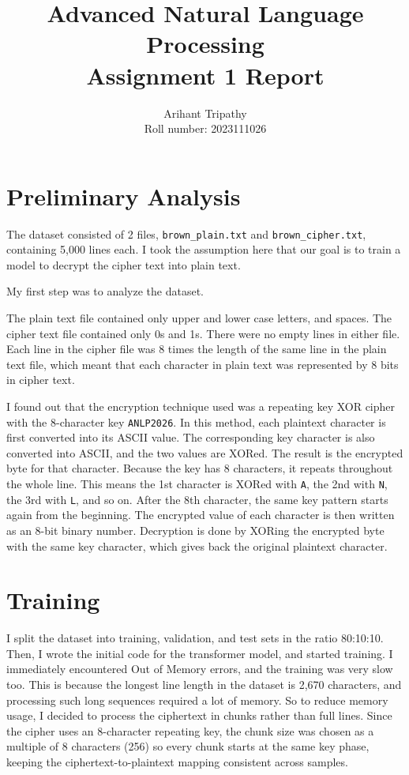 \documentclass[12pt]{article}
\title{\vspace{-1.2cm}Advanced Natural Language Processing\\Assignment 1 Report}
\author{Arihant Tripathy\\\normalsize Roll number: 2023111026}
\date{}
\begin{document}
\maketitle
\vspace{-1cm}

\section{Preliminary Analysis}

The dataset consisted of 2 files, \texttt{brown\_plain.txt} and
\texttt{brown\_cipher.txt}, containing 5,000 lines each. I took the assumption
here that our goal is to train a model to decrypt the cipher text into plain
text.

My first step was to analyze the dataset.

The plain text file contained only upper and lower case letters, and spaces. The
cipher text file contained only 0s and 1s. There were no empty lines in either
file. Each line in the cipher file was 8 times the length of the same line in
the plain text file, which meant that each character in plain text was
represented by 8 bits in cipher text.

I found out that the encryption technique used was a repeating key XOR cipher
with the 8-character key \texttt{ANLP2026}. In this method, each plaintext
character is first converted into its ASCII value. The corresponding key
character is also converted into ASCII, and the two values are XORed. The result
is the encrypted byte for that character. Because the key has 8 characters, it
repeats throughout the whole line. This means the 1st character is XORed with
\texttt{A}, the 2nd with \texttt{N}, the 3rd with \texttt{L}, and so on. After
the 8th character, the same key pattern starts again from the beginning. The
encrypted value of each character is then written as an 8-bit binary number.
Decryption is done by XORing the encrypted byte with the same key character,
which gives back the original plaintext character.

\section{Training}

I split the dataset into training, validation, and test sets in the ratio
80:10:10. Then, I wrote the initial code for the transformer model, and started
training. I immediately encountered Out of Memory errors, and the training was
very slow too. This is because the longest line length in the dataset is 2,670
characters, and processing such long sequences required a lot of memory. So to
reduce memory usage, I decided to process the ciphertext in chunks rather than
full lines. Since the cipher uses an 8-character repeating key, the chunk size
was chosen as a multiple of 8 characters (256) so every chunk starts at the same
key phase, keeping the ciphertext-to-plaintext mapping consistent across
samples.
\end{document}
